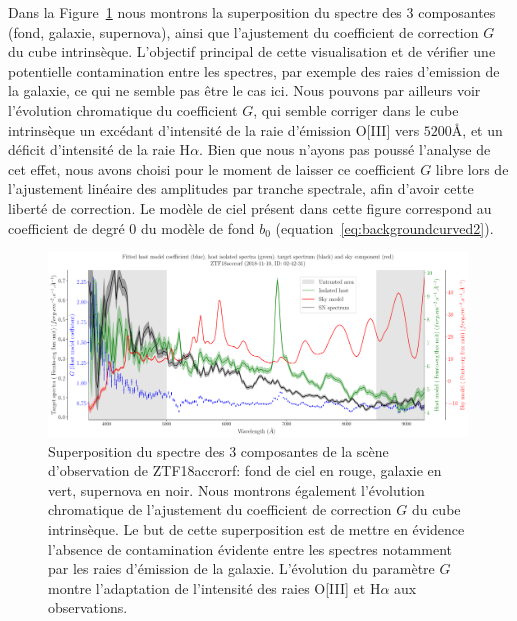 \documentclass[../main/main.tex]{subfiles}
\begin{document}
Dans la Figure~\ref{fig:allsourcesZTF18accrorf} nous montrons la
superposition du spectre des 3 composantes (fond, galaxie, supernova),
ainsi que l'ajustement du coefficient de correction $G$ du cube
intrinsèque. L'objectif principal de cette visualisation et de vérifier
une potentielle contamination entre les spectres, par exemple des raies
d'emission de la galaxie, ce qui ne semble pas être le cas ici.
Nous pouvons par ailleurs voir l'évolution chromatique du coefficient $G$,
qui semble corriger dans le cube intrinsèque un excédant d'intensité de la raie d'émission O[III] vers
$5200$\AA, et un déficit d'intensité de la raie H$\alpha$. Bien que nous
n'ayons pas poussé l'analyse de cet effet, nous avons choisi pour le
moment de laisser ce coefficient $G$ libre lors de l'ajustement
linéaire des amplitudes par tranche spectrale, afin d'avoir cette
liberté de correction.
Le modèle de ciel présent dans cette figure correspond au coefficient
de degré $0$ du modèle de fond $b_{0}$ (equation~\ref{eq:backgroundcurved2}).

\begin{figure}
  \centering
  \includegraphics[width=0.99\textwidth]{../figures/07_scene/overlapped_component_ZTF18accrorf.pdf}
  \caption[Superposition du spectre des 3 composantes de la scène
  ZTF18accrorf.]{Superposition du spectre des 3 composantes de la scène d'observation de ZTF18accrorf: fond de
    ciel en rouge,
    galaxie en vert, supernova en noir.
    Nous montrons également l'évolution chromatique de l'ajustement du coefficient de correction $G$ du cube
    intrinsèque. Le but de cette superposition est de mettre en évidence
    l'absence de contamination évidente entre les spectres notamment par
    les raies d'émission de la galaxie. L'évolution du paramètre $G$
    montre l'adaptation de l'intensité des raies O[III] et H$\alpha$ aux observations.}
  \label{fig:allsourcesZTF18accrorf}
\end{figure}
\end{document}
